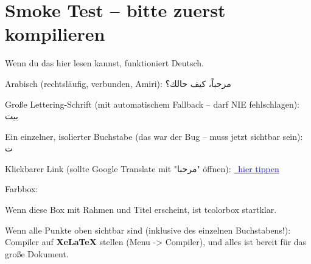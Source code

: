 \documentclass[12pt,a4paper]{article}
\begin{document}
\section*{Smoke Test -- bitte zuerst kompilieren}
Wenn du das hier lesen kannst, funktioniert Deutsch. \faSmileWink

Arabisch (rechtsläufig, verbunden, Amiri):
\textarabic{مرحباً، كيف حالك؟}

Große Lettering-Schrift (mit automatischem Fallback -- darf NIE fehlschlagen):
\textarabic{\bigletterfont\fontsize{40}{40}\selectfont بيت}

Ein einzelner, isolierter Buchstabe (das war der Bug -- muss jetzt sichtbar sein):
\textarabic{\bigletterfont\fontsize{40}{40}\selectfont ت}

Klickbarer Link (sollte Google Translate mit "مرحبا" öffnen):
\href{https://translate.google.com/?sl=ar&tl=de&op=translate&text=%D9%85%D8%B1%D8%AD%D8%A8%D8%A7}{\textcolor{blue}{\faVolumeUp\ hier tippen}}

Farbbox:
\begin{tcolorbox}[colback=orange!15,colframe=orange!70!black,title=Test-Box]
Wenn diese Box mit Rahmen und Titel erscheint, ist tcolorbox startklar.
\end{tcolorbox}

Wenn alle Punkte oben sichtbar sind (inklusive des einzelnen Buchstabens!):
Compiler auf \textbf{XeLaTeX} stellen (Menu -> Compiler), und alles ist
bereit für das große Dokument.
\end{document}
